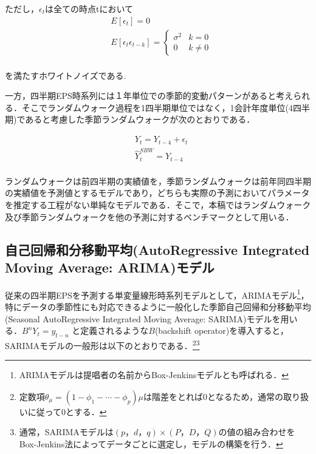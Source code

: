 \documentclass[a4paper，11pt]{jsarticle}
\begin{document}
ただし，$\epsilon_t$は全ての時点tにおいて
\begin{equation}
  \begin{split}
    & E[\epsilon_t] = 0 \\
    & E[\epsilon_t \epsilon_{t-k}] = \left\{
      \begin{array}{ll}
        \sigma^2 & k=0 \\
        0 & k \neq 0
      \end{array}\right.\\
  \end{split}
\end{equation}    

を満たすホワイトノイズである.

一方，四半期EPS時系列には１年単位での季節的変動パターンがあると考えられる．そこでランダムウォーク過程を1四半期単位ではなく，1会計年度単位(4四半期)であると考慮した季節ランダムウォークが次のとおりである．

\begin{equation}
  \begin{split}
    & Y_t = Y_{t-4} + \epsilon_t \\
    & \hat{Y}_t^{SRW} = Y_{t-4} \\
  \end{split}
\end{equation} 

ランダムウォークは前四半期の実績値を，季節ランダムウォークは前年同四半期の実績値を予測値とするモデルであり，どちらも実際の予測においてパラメータを推定する工程がない単純なモデルである．そこで，本稿ではランダムウォーク及び季節ランダムウォークを他の予測に対するベンチマークとして用いる．

\subsection{自己回帰和分移動平均(AutoRegressive Integrated Moving Average: ARIMA)モデル}

従来の四半期EPSを予測する単変量線形時系列モデルとして，ARIMAモデル\footnote{ARIMAモデルは提唱者の名前からBox-Jenkinsモデルとも呼ばれる．}，特にデータの季節性にも対応できるように一般化した季節自己回帰和分移動平均(Seasonal AutoRegressive Integrated Moving Average: SARIMA)モデルを用いる．$B^nY_t = y_{t-n}$ と定義されるような$B$(backshift operator)を導入すると，SARIMAモデルの一般形は以下のとおりである．\footnote{定数項$\theta_{\mu}=(1-\phi_1-\cdots-\phi_p)\mu$は階差をとれば0となるため，通常の取り扱いに従って0とする．}\footnote{通常，SARIMAモデルは$(p，d，q) \times (P，D，Q)$の値の組み合わせをBox-Jenkins法によってデータごとに選定し，モデルの構築を行う．}
\end{document}
